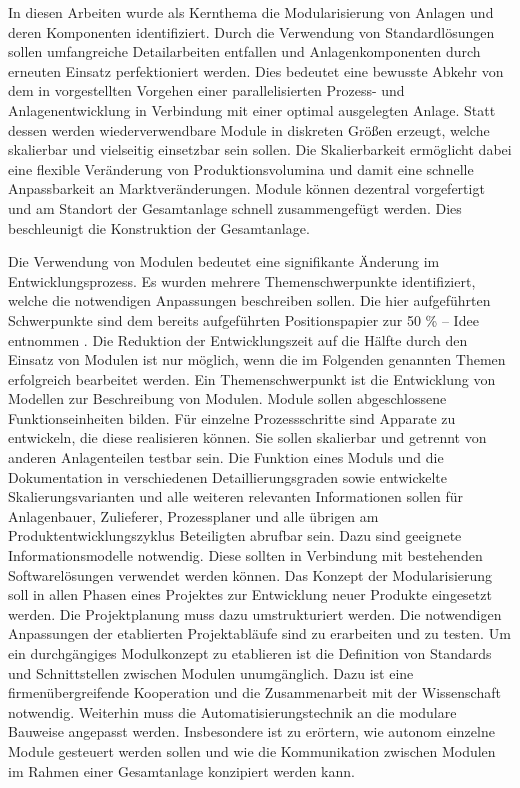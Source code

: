 In diesen Arbeiten wurde als Kernthema die Modularisierung von Anlagen und deren Komponenten identifiziert. Durch die Verwendung von Standardl\"osungen sollen umfangreiche Detailarbeiten entfallen und Anlagenkomponenten durch erneuten Einsatz perfektioniert werden. Dies bedeutet eine bewusste Abkehr von dem in \cite{Dietz_2000} vorgestellten Vorgehen einer parallelisierten Prozess- und Anlagenentwicklung in Verbindung mit einer optimal ausgelegten Anlage. Statt dessen werden wiederverwendbare Module in diskreten Gr\"o\ss{}en erzeugt, welche skalierbar und vielseitig einsetzbar sein sollen. Die Skalierbarkeit erm\"oglicht dabei eine flexible Ver\"anderung von Produktionsvolumina und damit eine schnelle Anpassbarkeit an Marktver\"anderungen. Module k\"onnen dezentral vorgefertigt und am Standort der Gesamtanlage schnell zusammengef\"ugt werden. Dies beschleunigt die Konstruktion der Gesamtanlage. \par

Die Verwendung von Modulen bedeutet eine signifikante \"Anderung im Entwicklungsprozess. Es wurden mehrere Themenschwerpunkte identifiziert, welche die notwendigen Anpassungen beschreiben sollen. Die hier aufgef\"uhrten Schwerpunkte sind dem bereits aufgef\"uhrten Positionspapier zur 50 \% -- Idee entnommen \cite{Processnet_2010}.  Die Reduktion der Entwicklungszeit auf die H\"alfte durch den Einsatz von Modulen ist nur m\"oglich, wenn die im Folgenden genannten Themen erfolgreich bearbeitet werden. \newline
Ein Themenschwerpunkt ist die Entwicklung von Modellen zur Beschreibung von Modulen. Module sollen abgeschlossene Funktionseinheiten bilden. F\"ur einzelne Prozessschritte sind Apparate zu entwickeln, die diese realisieren k\"onnen. Sie sollen skalierbar und getrennt von anderen Anlagenteilen testbar sein. \newline
Die Funktion eines Moduls und die Dokumentation in verschiedenen Detaillierungsgraden sowie entwickelte Skalierungsvarianten und alle weiteren relevanten Informationen sollen f\"ur Anlagenbauer, Zulieferer, Prozessplaner und alle \"ubrigen am Produktentwicklungszyklus Beteiligten abrufbar sein. Dazu sind geeignete Informationsmodelle notwendig. Diese sollten in Verbindung mit bestehenden Softwarel\"osungen verwendet werden k\"onnen. \cite{Processnet_2010}\newline
Das Konzept der Modularisierung soll in allen Phasen eines Projektes zur Entwicklung neuer Produkte eingesetzt werden. Die Projektplanung muss dazu umstrukturiert werden. Die notwendigen Anpassungen der etablierten Projektabl\"aufe sind zu erarbeiten und zu testen. \cite{Processnet_2010} \newline
Um ein durchg\"angiges Modulkonzept zu etablieren ist die Definition von Standards und Schnittstellen zwischen Modulen unumg\"anglich. Dazu ist eine firmen\"ubergreifende Kooperation und die Zusammenarbeit mit der Wissenschaft notwendig. \cite{Processnet_2010} \newline
Weiterhin muss die Automatisierungstechnik an die modulare Bauweise angepasst werden. Insbesondere ist zu er\"ortern, wie autonom einzelne Module gesteuert werden sollen und wie die Kommunikation zwischen Modulen im Rahmen einer Gesamtanlage konzipiert werden kann. \cite{Processnet_2010}

